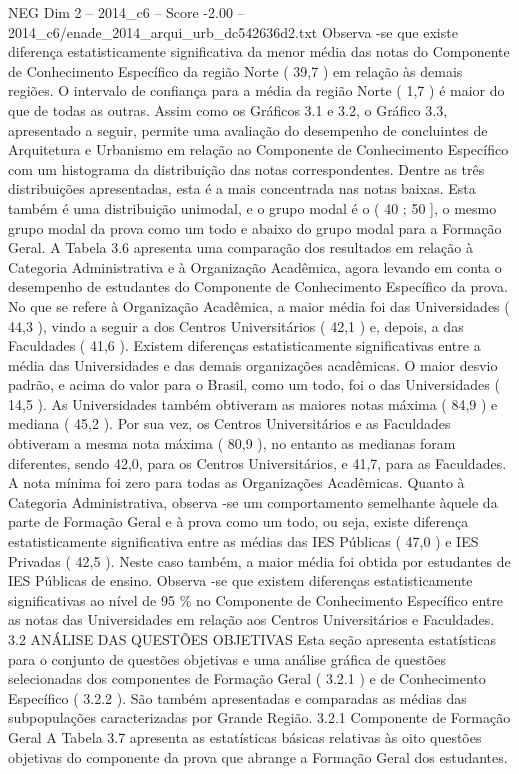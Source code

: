 \begin{textsample}{NEG Dim 2 – 2014\_c6 – Score -2.00 – 2014\_c6/enade\_2014\_arqui\_urb\_dc542636d2.txt}
Observa -se que existe diferença estatisticamente significativa da menor média das notas do Componente de Conhecimento Específico da região Norte ( 39,7 ) em relação às demais regiões.
O intervalo de confiança para a média da região Norte ( 1,7 ) é maior do que de todas as outras.
Assim como os Gráficos 3.1 e 3.2, o Gráfico 3.3, apresentado a seguir, permite uma avaliação do desempenho de concluintes de Arquitetura e Urbanismo em relação ao Componente de Conhecimento Específico com um histograma da distribuição das notas correspondentes.
Dentre as três distribuições apresentadas, esta é a mais concentrada nas notas baixas.
Esta também é uma distribuição unimodal, e o grupo modal é o ( 40 ; 50 ], o mesmo grupo modal da prova como um todo e abaixo do grupo modal para a Formação Geral.
A Tabela 3.6 apresenta uma comparação dos resultados em relação à Categoria Administrativa e à Organização Acadêmica, agora levando em conta o desempenho de estudantes do Componente de Conhecimento Específico da prova.
No que se refere à Organização Acadêmica, a maior média foi das Universidades ( 44,3 ), vindo a seguir a dos Centros Universitários ( 42,1 ) e, depois, a das Faculdades ( 41,6 ).
Existem diferenças estatisticamente significativas entre a média das Universidades e das demais organizações acadêmicas.
O maior desvio padrão, e acima do valor para o Brasil, como um todo, foi o das Universidades ( 14,5 ).
As Universidades também obtiveram as maiores notas máxima ( 84,9 ) e mediana ( 45,2 ).
Por sua vez, os Centros Universitários e as Faculdades obtiveram a mesma nota máxima ( 80,9 ), no entanto as medianas foram diferentes, sendo 42,0, para os Centros Universitários, e 41,7, para as Faculdades.
A nota mínima foi zero para todas as Organizações Acadêmicas.
Quanto à Categoria Administrativa, observa -se um comportamento semelhante àquele da parte de Formação Geral e à prova como um todo, ou seja, existe diferença estatisticamente significativa entre as médias das IES Públicas ( 47,0 ) e IES Privadas ( 42,5 ).
Neste caso também, a maior média foi obtida por estudantes de IES Públicas de ensino.
Observa -se que existem diferenças estatisticamente significativas ao nível de 95 \% no Componente de Conhecimento Específico entre as notas das Universidades em relação aos Centros Universitários e Faculdades. 3.2 ANÁLISE DAS QUESTÕES OBJETIVAS Esta seção apresenta estatísticas para o conjunto de questões objetivas e uma análise gráfica de questões selecionadas dos componentes de Formação Geral ( 3.2.1 ) e de Conhecimento Específico ( 3.2.2 ).
São também apresentadas e comparadas as médias das subpopulações caracterizadas por Grande Região. 3.2.1 Componente de Formação Geral A Tabela 3.7 apresenta as estatísticas básicas relativas às oito questões objetivas do componente da prova que abrange a Formação Geral dos estudantes.

\end{textsample}

